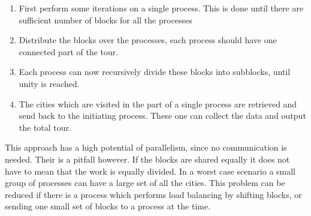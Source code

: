 \begin{enumerate}
\item First perform some iterations on a single process. This is done until
there are sufficient number of blocks for all the processes
\item Distribute the blocks over the processes, each process should have one
connected part of the tour.
\item Each process can now recursively divide these blocks into subblocks,
until unity is reached.
\item The cities which are visited in the part of a single process are
retrieved and send back to the initiating process. These one can collect the
data and output the total tour.
\end{enumerate}

This approach has a high potential of parallelism, since no communication is
needed. Their is a pitfall however. If the blocks are shared equally it does
not have to mean that the work is equally divided. In a worst case scenario a
small group of processes can have a large set of all the cities. This problem
can be reduced if there is a process which performs load balancing by shifting
blocks, or sending one small set of blocks to a process at the time.
